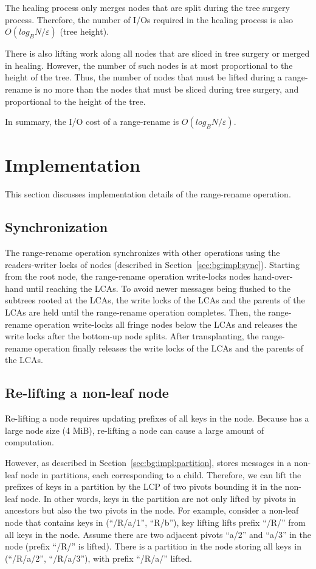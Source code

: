 The healing process only merges nodes that are split during the tree surgery
process.
Therefore, the number of I/Os required in the healing process is also
$O(log_{B}{N}/\varepsilon)$ (tree height).

There is also lifting work along all nodes that are sliced in tree surgery or
merged in healing.
However, the number of such nodes is at most proportional to the height of the
tree.
Thus, the number of nodes that must be lifted during a range-rename is no more
than the nodes that must be sliced during tree surgery, and proportional to
the height of the tree.

In summary, the I/O cost of a range-rename is $O(log_{B}{N}/\varepsilon)$.

\section{Implementation}
\label{sec:rr:impl}

This section discusses implementation details of the range-rename operation.

\subsection{Synchronization}
\label{sec:rr:impl:sync}

The range-rename operation synchronizes with other \bet operations using
the readers-writer locks of \bet nodes
(described in Section~\ref{sec:bg:impl:sync}).
Starting from the root node, the range-rename operation
write-locks \bet nodes hand-over-hand until reaching the LCAs.
To avoid newer messages being flushed to the subtrees rooted at the LCAs,
the write locks of the LCAs and the parents of the LCAs are held until the
range-rename operation completes.
Then, the range-rename operation write-locks all fringe nodes below the LCAs
and releases the write locks after the bottom-up node splits.
After transplanting, the range-rename operation finally releases the write locks
of the LCAs and the parents of the LCAs.

\subsection{Re-lifting a non-leaf node}

Re-lifting a node requires updating prefixes of all keys in the node.
Because \fti has a large node size (4 MiB),
re-lifting a node can cause a large amount of computation.

However, as described in Section~\ref{sec:bg:impl:partition},
\fti stores messages in a non-leaf node in partitions,
each corresponding to a child.
Therefore, we can lift the prefixes of keys in a partition by the
LCP of two pivots bounding it in the non-leaf node.
In other words, keys in the partition are not only lifted by pivots in ancestors
but also the two pivots in the node.
For example, consider a non-leaf node that contains keys in
(``/R/a/1'', ``R/b''),
key lifting lifts prefix ``/R/'' from all keys in the node.
Assume there are two adjacent pivots ``a/2'' and ``a/3'' in the node
(prefix ``/R/'' is lifted).
There is a partition in the node storing all keys in (``/R/a/2'', ``/R/a/3''),
with prefix ``/R/a/'' lifted.

